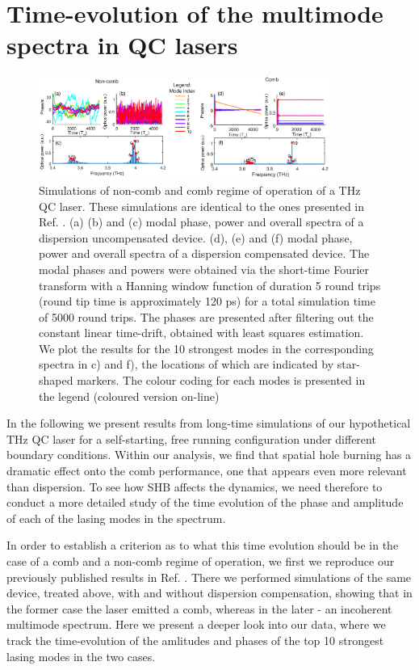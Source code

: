 \documentclass[journal]{IEEEtran}
\begin{document}
	\section{Time-evolution of the multimode spectra in QC lasers}
	\label{sec:time-evo}
	\begin{figure}[h!]
		\centering
		\includegraphics[width=0.85\textwidth]{IMGS/COMB_vs_NOCOMB1}
		\caption{Simulations of non-comb and comb regime of operation of a THz QC laser. These simulations are identical to the ones presented in Ref. \cite{petz2016}. (a) (b) and (c) modal phase, power and overall spectra of a dispersion uncompensated device. (d), (e) and (f) modal phase, power and overall spectra of a dispersion compensated device. The modal phases and powers were obtained via the short-time Fourier transform with a Hanning window function of duration 5 round trips (round tip time is approximately 120 ps) for a total simulation time of 5000 round trips. The phases are presented after filtering out the constant linear time-drift, obtained with least squares estimation. We plot the results for the 10 strongest modes in the corresponding spectra in c) and f), the locations of which are indicated by star-shaped markers.  The colour coding for each modes is presented in the legend (coloured version on-line)}	\label{fig:combnocomb1}
	\end{figure}
	
	In the following we present results from long-time simulations of our hypothetical THz QC laser for a self-starting, free running configuration under different boundary conditions. Within our analysis, we find that spatial hole burning has a dramatic effect onto the comb performance, one that appears even more relevant than dispersion. To see how SHB affects the dynamics, we need therefore to conduct a more detailed study of the time evolution of the phase and amplitude of each of the lasing modes in the spectrum. 
	
	In order to establish a criterion as to what this time evolution should be in the case of a comb and a non-comb regime of operation, we first we reproduce our previously published results in Ref. \cite{petz2016}. There we performed simulations of the same device, treated above, with and without dispersion compensation, showing that in the former case the laser emitted a comb, whereas in the later - an incoherent multimode spectrum. Here we present a deeper look into our data, where we track the time-evolution of the amlitudes and phases of the top 10 strongest lasing modes in the two cases. 
	
\end{document}
